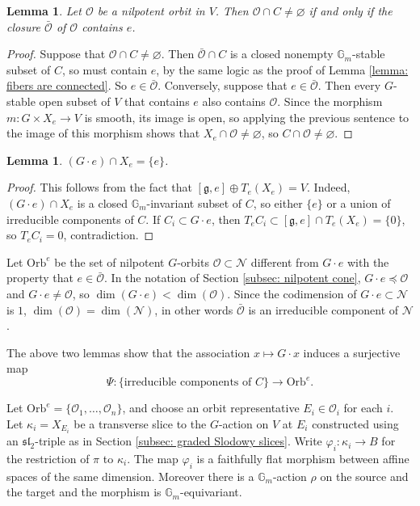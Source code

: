\documentclass{article} %
\newtheorem{lemma}[proposition]{Lemma}
\numberwithin{equation}{section}
\theoremstyle{definition}
\newcommand{\G}{\mathbb{G}}
\renewcommand{\O}{\mathcal{O}}
\newcommand{\calO}{\mathcal{O}}
\newcommand{\frakg}{\mathfrak g}
\newcommand{\fraksl}{\mathfrak{sl}}
\begin{document}
\begin{lemma}
    Let $\calO$ be a nilpotent orbit in $V$. Then $\calO\cap C \neq \varnothing$ if and only if the closure $\bar{\calO}$ of $\calO$ contains $e$.
\end{lemma}
\begin{proof}
    Suppose that $\calO \cap C \neq \varnothing$.
    Then $\bar{\calO}\cap C$ is a closed nonempty $\G_m$-stable subset of $C$, so must contain $e$, by the same logic as the proof of Lemma \ref{lemma: fibers are connected}.
    So $e\in \bar{\calO}$.
    Conversely, suppose that $e\in \bar{\calO}$.
    Then every $G$-stable open subset of $V$ that contains $e$ also contains $\calO$.
    Since the morphism $m\colon G\times X_e \rightarrow V$ is smooth, its image is open, so applying the previous sentence to the image of this morphism shows that $X_e\cap \calO \neq \varnothing$, so $C\cap \calO \neq \varnothing$.
\end{proof}


\begin{lemma}
    $(G\cdot e) \cap  X_e = \{e\}$.
\end{lemma}
\begin{proof}
    This follows from the fact that $[\frakg,e] \oplus T_e(X_e) = V$.
    Indeed, $(G\cdot e)\cap X_e$ is a closed $\G_m$-invariant subset of $C$, so either $\{e\}$ or a union of irreducible components of $C$.
    If $C_i\subset G\cdot e$, then $T_e C_i \subset [\frakg,e]\cap T_e(X_e)= \{0\}$, so $T_eC_i = 0$, contradiction.
\end{proof}


Let $\mathrm{Orb}^e$ be the set of nilpotent $G$-orbits $\calO\subset \mathcal{N}$ different from $G\cdot e$ with the property that $e\in \bar{\O}$.
In the notation of Section \ref{subsec: nilpotent cone}, $G\cdot e\preceq \O$ and $G\cdot e\neq \O$, so $\dim(G\cdot e) < \dim(\calO)$.
Since the codimension of $G\cdot e\subset \mathcal{N}$ is $1$, $\dim(\calO)=\dim(\mathcal{N})$, in other words $\bar{\O}$ is an irreducible component of $\mathcal{N}$.

The above two lemmas show that the association $x\mapsto G\cdot x$ induces a surjective map 
\[
\Psi\colon \{\text{irreducible components of }C\}\rightarrow \mathrm{Orb}^e.
\]


Let $\mathrm{Orb}^e = \{\O_1, \dots, \O_n\}$, and choose an orbit representative $E_i \in \O_i$ for each $i$. Let $\kappa_i = X_{E_i}$ be a transverse slice to the $G$-action on $V$ at $E_i$ constructed using an $\fraksl_2$-triple as in Section \ref{subsec: graded Slodowy slices}. Write $\varphi_i: \kappa_i \to B$ for the restriction of $\pi$ to $\kappa_i$.
The map $\varphi_i$ is a faithfully flat morphism between affine spaces of the same dimension.
Moreover there is a $\G_m$-action $\rho$ on the source and the target and the morphism is $\G_m$-equivariant.
\end{document}
